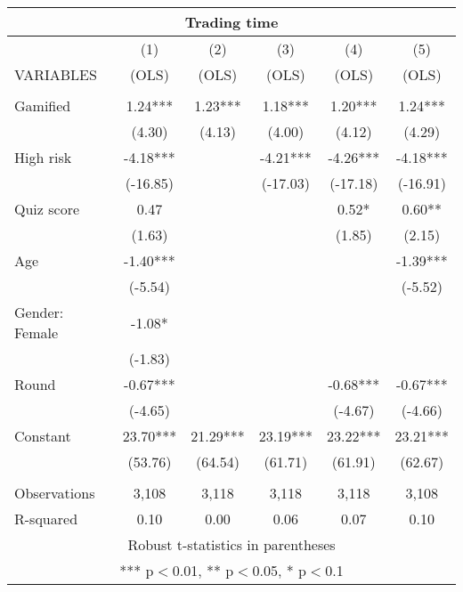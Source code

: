 \documentclass[]{article}
\begin{document}
\begin{tabular}{lccccc}
\multicolumn{6}{c}{Trading time} \\ \hline
 & (1) & (2) & (3) & (4) & (5) \\
VARIABLES & (OLS) & (OLS) & (OLS) & (OLS) & (OLS) \\ \hline
 &  &  &  &  &  \\
Gamified & 1.24*** & 1.23*** & 1.18*** & 1.20*** & 1.24*** \\
 & (4.30) & (4.13) & (4.00) & (4.12) & (4.29) \\
High risk & -4.18*** &  & -4.21*** & -4.26*** & -4.18*** \\
 & (-16.85) &  & (-17.03) & (-17.18) & (-16.91) \\
Quiz score & 0.47 &  &  & 0.52* & 0.60** \\
 & (1.63) &  &  & (1.85) & (2.15) \\
Age & -1.40*** &  &  &  & -1.39*** \\
 & (-5.54) &  &  &  & (-5.52) \\
Gender: Female & -1.08* &  &  &  &  \\
 & (-1.83) &  &  &  &  \\
Round & -0.67*** &  &  & -0.68*** & -0.67*** \\
 & (-4.65) &  &  & (-4.67) & (-4.66) \\
Constant & 23.70*** & 21.29*** & 23.19*** & 23.22*** & 23.21*** \\
 & (53.76) & (64.54) & (61.71) & (61.91) & (62.67) \\
 &  &  &  &  &  \\
Observations & 3,108 & 3,118 & 3,118 & 3,118 & 3,108 \\
 R-squared & 0.10 & 0.00 & 0.06 & 0.07 & 0.10 \\ \hline
\multicolumn{6}{c}{ Robust t-statistics in parentheses} \\
\multicolumn{6}{c}{ *** p$<$0.01, ** p$<$0.05, * p$<$0.1} \\
\end{tabular}
\end{document}
